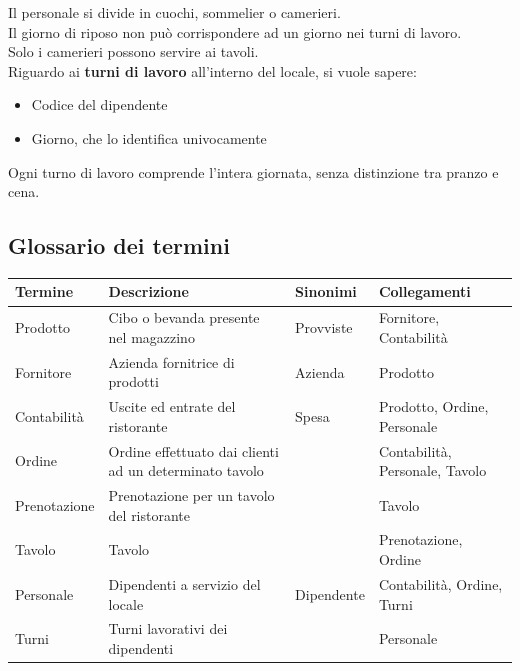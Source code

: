 Il personale si divide in cuochi, sommelier o camerieri.\\
Il giorno di riposo non può corrispondere ad un giorno nei turni di lavoro. \\
Solo i camerieri possono servire ai tavoli. \medskip \\
Riguardo ai \textbf{turni di lavoro} all’interno del locale, si vuole sapere:
\begin{itemize}
    \item Codice del dipendente
    \item Giorno, che lo identifica univocamente
\end{itemize}
Ogni turno di lavoro comprende l'intera giornata, senza distinzione tra pranzo e cena.

\subsection{Glossario dei termini}
\begin{longtable}{p{2.5cm} p{6cm} p{2cm} p{5.5cm}}
    \toprule
    \textbf{Termine} & \textbf{Descrizione} & \textbf{Sinonimi} & \textbf{Collegamenti}\\ \midrule
    Prodotto & Cibo o bevanda presente nel magazzino & Provviste & Fornitore, Contabilità \\ \midrule
    Fornitore & Azienda fornitrice di prodotti & Azienda & Prodotto \\ \midrule
    Contabilità & Uscite ed entrate del ristorante & Spesa & Prodotto, Ordine, Personale \\ \midrule
    Ordine & Ordine effettuato dai clienti ad un determinato tavolo & & Contabilità, Personale, Tavolo \\ \midrule
    Prenotazione & Prenotazione per un tavolo del ristorante & & Tavolo \\ \midrule
    Tavolo & Tavolo & & Prenotazione, Ordine\\ \midrule
    Personale & Dipendenti a servizio del locale & Dipendente & Contabilità, Ordine, Turni\\ \midrule
    Turni & Turni lavorativi dei dipendenti & & Personale	\\ \midrule
\end{longtable}


